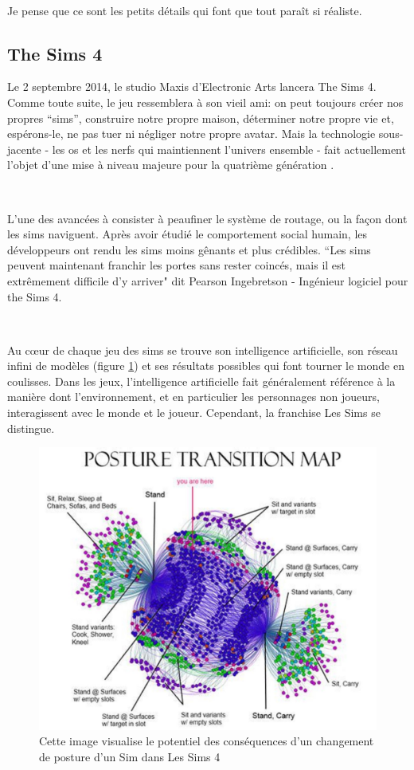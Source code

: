 ~\par
Je pense que ce sont les petits détails qui font que tout paraît si réaliste.




\subsection{The Sims 4}\label{sims4}

Le 2 septembre 2014, le studio Maxis d'Electronic Arts lancera The Sims 4. Comme toute suite, le jeu ressemblera à son vieil ami: on peut toujours créer nos propres “sims”, construire notre propre maison, déterminer notre propre vie et, espérons-le, ne pas tuer ni négliger notre propre avatar. Mais la technologie sous-jacente - les os et les nerfs qui maintiennent l’univers ensemble - fait actuellement l’objet d’une mise à niveau majeure pour la quatrième génération \parencite{simsArticle}.

~\par
L’une des avancées à consister à peaufiner le système de routage, ou la façon dont les sims naviguent. Après avoir étudié le comportement social humain, les développeurs ont rendu les sims moins gênants et plus crédibles. “Les sims peuvent maintenant franchir les portes sans rester coincés, mais il est extrêmement difficile d'y arriver" dit Pearson Ingebretson - Ingénieur logiciel pour the Sims 4. 

~\par
Au cœur de chaque jeu des sims se trouve son intelligence artificielle, son réseau infini de modèles (figure \ref{fig:sims}) et ses résultats possibles qui font tourner le monde en coulisses. Dans les jeux, l'intelligence artificielle fait généralement référence à la manière dont l'environnement, et en particulier les personnages non joueurs, interagissent avec le monde et le joueur. Cependant, la franchise Les Sims se distingue.

\begin{figure}[th]
\centering
\includegraphics{Figures/sims.JPG}
\decoRule
\caption{Cette image visualise le potentiel des conséquences d'un changement de posture d'un Sim dans Les Sims 4}
\label{fig:sims}
\end{figure}


